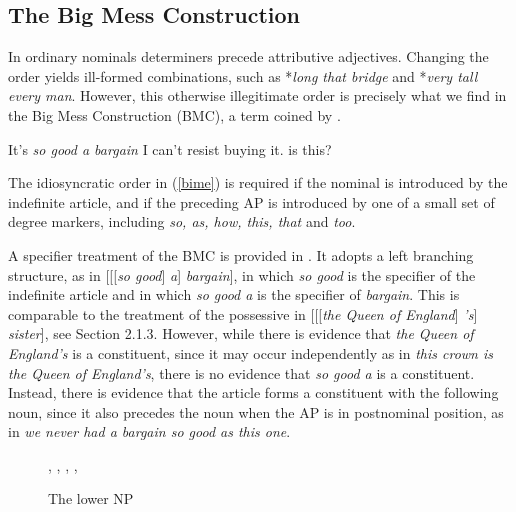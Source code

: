 \documentclass[output=paper]{langsci/langscibook}
\begin{document}
\subsection{The Big Mess Construction} 


In ordinary nominals determiners precede attributive adjectives. Changing the order 
yields ill-formed combinations, such as *{\it long that bridge\/} and *{\it very tall every man}. 
However, this otherwise illegitimate order is precisely what we find in 
the Big Mess Construction (BMC), a term coined by \citet{Berman74}.  

\begin{exe}
\ex\label{bime}
\begin{xlist}
\ex   It's {\it so good a bargain\/} I can't resist buying it.
 is this?
\end{xlist}
\end{exe} 

\noindent
The idiosyncratic order in (\ref{bime}) is required if the nominal is introduced 
by the indefinite article, and if the preceding AP is introduced by one of a small 
set of degree markers, including {\it so, as, how, this, that\/} and {\it too}. 

A specifier treatment of the BMC is provided in \citet[201]{GS00}. It adopts  
a left branching structure, as in  [[[{\it so good\/}] {\it a\/}] {\it bargain\/}], 
in which {\it so good\/} is the specifier of the indefinite article and in which 
{\it so good a\/} is the specifier of {\it bargain}. This is comparable to the 
treatment of the possessive in [[[{\it the Queen of England\/}] {\it 's\/}] {\it sister\/}],
see Section 2.1.3.  
However, while there is evidence that {\it the Queen of England's\/} is a constituent,
since it may occur independently as in {\it this crown is the Queen of England's}, there is 
no evidence that {\it so good a\/} is a constituent. Instead, there is evidence that 
the article forms a constituent with the following noun, since it also precedes the noun 
when the AP is in postnominal position, as in {\it we never had a bargain so good as this one\/}.

\begin{figure}
\begin{center}
\tree
{,    
  {,    
    {}},
  {,
    {}}}
\caption{\label{aprob} The lower NP }
\end{center}
\end{figure}
\end{document}
